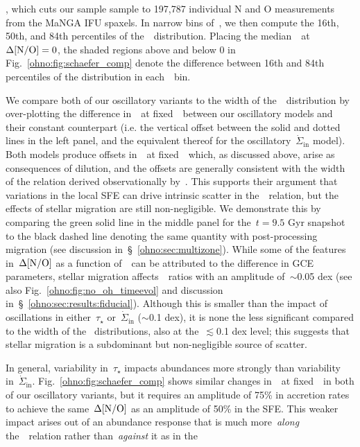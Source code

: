 \citep{Licquia2015}, which cuts our sample sample to 197,787 individual N and O
measurements from the MaNGA IFU spaxels.
In narrow bins of~\oh, we then compute the 16th, 50th, and 84th percentiles of
the~\no~distribution.
Placing the median~\no~at~$\Delta\text{[N/O]} = 0$, the shaded regions above and below
0 in Fig.~\ref{ohno:fig:schaefer_comp} denote the difference between 16th and 84th
percentiles of the distribution in each~\oh~bin.
\par
We compare both of our oscillatory variants to the width of the~\no~distribution
by over-plotting the difference in~\no~at fixed~\oh~between our oscillatory
models and their constant counterpart (i.e. the vertical offset between the
solid and dotted lines in the left panel, and the equivalent thereof for the
oscillatory~$\dot{\Sigma}_\text{in}$ model).
Both models produce offsets in~\no~at fixed~\oh~which, as discussed above,
arise as consequences of dilution, and the offsets are generally consistent
with the width of the relation derived observationally by~\citet{Schaefer2020}.
This supports their argument that variations in the local SFE can drive
intrinsic scatter in the~\ohno~relation, but the effects of stellar migration
are still non-negligible.
We demonstrate this by comparing the green solid line in the middle panel for
the~$t = 9.5$ Gyr snapshot to the black dashed line denoting the same quantity
with post-processing migration (see discussion in~\S~\ref{ohno:sec:multizone}).
While some of the features in~$\Delta\text{[N/O]}$ as a function of~\oh~can be
attributed to the difference in GCE parameters, stellar migration
affects~\no~ratios with an amplitude of~$\sim$0.05 dex (see also
Fig.~\ref{ohno:fig:no_oh_timeevol} and discussion in~\S~\ref{ohno:sec:results:fiducial}).
Although this is smaller than the impact of oscillations in either~$\tau_\star$
or~$\dot{\Sigma}_\text{in}$ ($\sim$0.1 dex), it is none the less significant
compared to the width of the~\citet{Schaefer2020} distributions, also at
the~$\lesssim$0.1 dex level; this suggests that stellar migration is a
subdominant but non-negligible source of scatter.
\par
In general, variability in~$\tau_\star$ impacts abundances more strongly than
variability in~$\dot{\Sigma}_\text{in}$.
Fig.~\ref{ohno:fig:schaefer_comp} shows similar changes in~\no~at fixed~\oh~in both
of our oscillatory variants, but it requires an amplitude of 75\% in accretion
rates to achieve the same~$\Delta\text{[N/O]}$ as an amplitude of 50\% in the SFE.
This weaker impact arises out of an abundance response that is much
more~\textit{along} the~\ohno~relation rather than~\textit{against} it as in the
